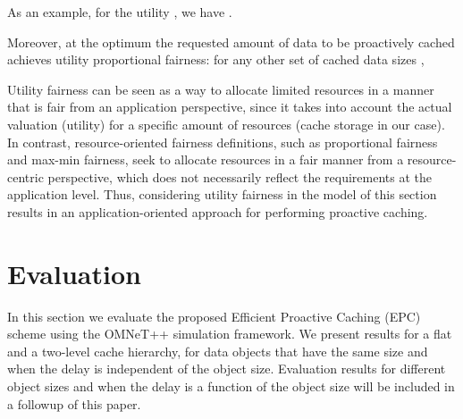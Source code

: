 \documentclass[conference]{IEEEtran}
\newcommand{\mynotex}[1]{}
\begin{document}
As an example, for the utility , we have .


Moreover, at the optimum the requested amount of data to be proactively cached  achieves utility proportional fairness: for any other set of cached data sizes ,

Utility fairness can be seen as a way to allocate limited resources in a manner that is fair from an application perspective, since it takes into account the actual valuation (utility) for a specific amount of resources (cache storage in our case). In contrast, resource-oriented fairness definitions, such as proportional fairness and max-min fairness, seek to allocate resources in a fair manner from a resource-centric perspective, which does not necessarily reflect the requirements at the application level. Thus, considering utility fairness in the model of this section results in an application-oriented approach for performing proactive caching.


\vspace{-0.09in}
\section{Evaluation}
\label{sec:evaluation}
\vspace{-0.03in}

\mynotex{Comparison with/influence of
\begin{itemize}
\item Optimal scheme for single-level and oracle
\item distribution of a given/fixed total cache storage to leaf and mid-level caches, for different total cache storage
\item ratio (total cache)/demand, for different values of mid-level buffer
\item influence of mobile transition probabilities
\item influence of delay costs 
\item probably not: mid-level cache and leaf cache size
\end{itemize}
}

In this section we evaluate the proposed Efficient Proactive Caching (EPC) scheme  using the OMNeT++ simulation framework. We present results for a flat and a two-level cache hierarchy, for data objects that have the same size and when the delay is independent of the object size. Evaluation results for different object sizes and when the delay is a function of the  object size will be included in a followup of this paper.
\end{document}
